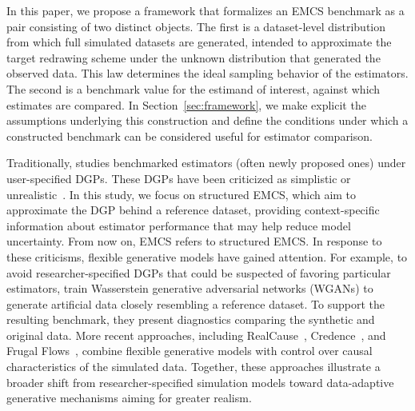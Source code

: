 In this paper, we propose a framework that formalizes an EMCS benchmark as a pair consisting of two distinct objects. The first is a dataset-level distribution from which full simulated datasets are generated, intended to approximate the target redrawing scheme under the unknown distribution that generated the observed data. This law determines the ideal sampling behavior of the estimators. The second is a benchmark value for the estimand of interest, against which estimates are compared. In Section~\ref{sec:framework}, we make explicit the assumptions underlying this construction and define the conditions under which a constructed benchmark can be considered useful for estimator comparison.

Traditionally, studies benchmarked estimators (often newly proposed ones) under user-specified DGPs. These DGPs have been criticized as simplistic or unrealistic~\supercite{huberPerformanceEstimatorsBased2013,gentzelCaseEvaluatingCausal,boulesteixIntroductionStatisticalSimulations2020}. In this study, we focus on structured EMCS, which aim to approximate the DGP behind a reference dataset, providing context-specific information about estimator performance that may help reduce model uncertainty. From now on, EMCS refers to structured EMCS. In response to these criticisms, flexible generative models have gained attention. For example, to avoid researcher-specified DGPs that could be suspected of favoring particular estimators,  train Wasserstein generative adversarial networks (WGANs) to generate artificial data closely resembling a reference dataset. To support the resulting benchmark, they present diagnostics comparing the synthetic and original data. More recent approaches, including RealCause~\supercite{nealRealCauseRealisticCausal2021}, Credence~\supercite{parikhValidatingCausalInference}, and Frugal Flows~\supercite{manelaMarginalCausalFlows2024}, combine flexible generative models with control over causal characteristics of the simulated data. Together, these approaches illustrate a broader shift from researcher-specified simulation models toward data-adaptive generative mechanisms aiming for greater realism.

